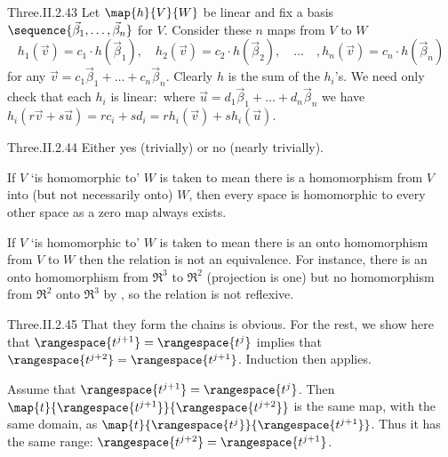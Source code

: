 \begin{ans}{Three.II.2.43}
      Let \( \map{h}{V}{W} \) be linear and fix a basis
      \( \sequence{\vec{\beta}_1,\dots,\vec{\beta}_n} \) for \( V \).
      Consider these \( n \) maps from \( V \) to \( W \)
      \begin{equation*}
        h_1(\vec{v})=c_1\cdot h(\vec{\beta}_1),
        \quad
        h_2(\vec{v})=c_2\cdot h(\vec{\beta}_2),
        \quad\ldots\quad,
        h_n(\vec{v})=c_n\cdot h(\vec{\beta}_n)
      \end{equation*}
      for any \( \vec{v}=c_1\vec{\beta}_1+\dots+c_n\vec{\beta}_n \).
      Clearly \( h \) is the sum of the \( h_i \)'s.
      We need only check that each \( h_i \) is linear:~where
      \( \vec{u}=d_1\vec{\beta}_1+\dots+d_n\vec{\beta}_n \) we have
      \( h_i(r\vec{v}+s\vec{u})=rc_i+sd_i=rh_i(\vec{v})+sh_i(\vec{u}) \).
    
\end{ans}
\begin{ans}{Three.II.2.44}
     Either yes (trivially) or no (nearly trivially).

     If \( V \) `is homomorphic to' \( W \) is taken to mean there is a
     homomorphism from \( V \) into (but not necessarily onto) \( W \),
     then every space is homomorphic to every other space as a zero map always
     exists.

     If \( V \) `is homomorphic to' \( W \) is taken to mean there is an
     onto homomorphism from \( V \) to \( W \) then the relation is not
     an equivalence.
     For instance, there is an onto
     homomorphism from \( \Re^3 \) to \( \Re^2 \)
     (projection is one) but no homomorphism from \( \Re^2 \) onto
     \( \Re^3 \) by ,
     so the relation is not reflexive.
   
\end{ans}
\begin{ans}{Three.II.2.45}
      That they form the chains is obvious.
      For the rest, we show here that
      \( \rangespace{t^{j+1}}=\rangespace{t^{j}} \)
      implies that
      \( \rangespace{t^{j+2}}=\rangespace{t^{j+1}} \).
      Induction then applies.

      Assume that
      \( \rangespace{t^{j+1}}=\rangespace{t^{j}} \).
      Then \( \map{t}{\rangespace{t^{j+1}}}{\rangespace{t^{j+2}}} \)
      is the same map, with the same domain, as
      \( \map{t}{\rangespace{t^{j}}}{\rangespace{t^{j+1}}} \).
      Thus it has the same range:
      \( \rangespace{t^{j+2}}=\rangespace{t^{j+1}} \).
    
\end{ans}
